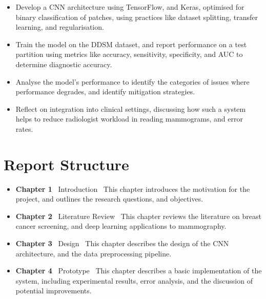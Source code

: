 \documentclass[main]{subfiles}
\begin{document}
\begin{itemize}
	\item Develop a CNN architecture using TensorFlow, and Keras, optimised for binary classification of patches, using practices like dataset splitting, transfer learning, and regularisation.
	\item Train the model on the DDSM dataset, and report performance on a test partition using metrics like accuracy, sensitivity, specificity, and AUC to determine diagnostic accuracy.
	\item Analyse the model's performance to identify the categories of issues where performance degrades, and identify mitigation strategies.
	\item Reflect on integration into clinical settings, discussing how such a system helps to reduce radiologist workload in reading mammograms, and error rates.
\end{itemize}

\section{Report Structure}
\label{sec:intro_report_structure}
\begin{itemize}
	\item \textbf{Chapter 1} \textemdash\ Introduction \textemdash\ This chapter introduces the motivation for the project, and outlines the research questions, and objectives.
	\item \textbf{Chapter 2} \textemdash\ Literature Review \textemdash\ This chapter reviews the literature on breast cancer screening, and deep learning applications to mammography.
	\item \textbf{Chapter 3} \textemdash\ Design \textemdash\ This chapter describes the design of the CNN architecture, and the data preprocessing pipeline.
	\item \textbf{Chapter 4} \textemdash\ Prototype \textemdash\ This chapter describes a basic implementation of the system, including experimental results, error analysis, and the discussion of potential improvements.
\end{itemize}
\end{document}
